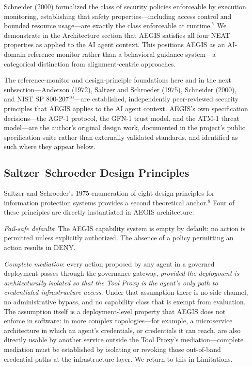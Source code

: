 \documentclass{IEEEcsmag}
\begin{document}
Schneider (2000) formalized the class of security policies enforceable by execution monitoring, establishing that safety properties---including access control and bounded resource usage---are exactly the class enforceable at runtime.$^{7}$ We demonstrate in the Architecture section that AEGIS satisfies all four NEAT properties as applied to the AI agent context. This positions AEGIS as an AI-domain reference monitor rather than a behavioral guidance system---a categorical distinction from alignment-centric approaches.

The reference-monitor and design-principle foundations here and in the next subsection---Anderson (1972), Saltzer and Schroeder (1975), Schneider (2000), and NIST SP 800-207$^{10}$---are established, independently peer-reviewed security principles that AEGIS applies to the AI agent context. AEGIS's own specification decisions---the AGP-1 protocol, the GFN-1 trust model, and the ATM-1 threat model---are the author's original design work, documented in the project's public specification suite rather than externally validated standards, and identified as such where they appear below.

\subsection{Saltzer--Schroeder Design Principles}

Saltzer and Schroeder's 1975 enumeration of eight design principles for information protection systems provides a second theoretical anchor.$^{8}$ Four of these principles are directly instantiated in AEGIS architecture:

{\it Fail-safe defaults}: The AEGIS capability system is empty by default; no action is permitted unless explicitly authorized. The absence of a policy permitting an action results in DENY.

{\it Complete mediation}: every action proposed by any agent in a governed deployment passes through the governance gateway, {\it provided the deployment is architecturally isolated so that the Tool Proxy is the agent's only path to credentialed infrastructure access}. Under that assumption there is no side channel, no administrative bypass, and no capability class that is exempt from evaluation. The assumption itself is a deployment-level property that AEGIS does not enforce in software: in more complex topologies---for example, a microservice architecture in which an agent's credentials, or credentials it can reach, are also directly usable by another service outside the Tool Proxy's mediation---complete mediation must be established by isolating or revoking those out-of-band credential paths at the infrastructure layer. We return to this in Limitations.
\end{document}
